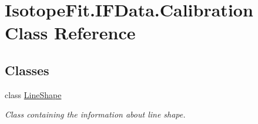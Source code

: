 \hypertarget{class_isotope_fit_1_1_i_f_data_1_1_calibration}{}\section{Isotope\+Fit.\+I\+F\+Data.\+Calibration Class Reference}
\label{class_isotope_fit_1_1_i_f_data_1_1_calibration}
\subsection*{Classes}
\begin{DoxyCompactItemize}
\item 
class \hyperlink{class_isotope_fit_1_1_i_f_data_1_1_calibration_1_1_line_shape}{Line\+Shape}
\begin{DoxyCompactList}\small\item\em Class containing the information about line shape. \end{DoxyCompactList}\end{DoxyCompactItemize}
